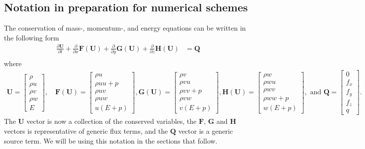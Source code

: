 \documentclass[10pt,letterpaper,notitlepage]{article}
\numberwithin{equation}{section}
\newcommand{\partialderiv}[2]{\frac{\partial #1}{\partial #2}}
\newcommand{\beqn}{\begin{equation}\begin{aligned}}
\newcommand{\eeqn}{\end{aligned}\end{equation}}
\begin{document}
\subsection{Notation in preparation for numerical schemes}
The conservation of mass-, momentum-, and energy equations can be written in the following form
\beqn \label{eq:euler_operator_form}
\partialderiv{\mathbf{U}}{t} + 
\partialderiv{}{x}\mathbf{F}(\mathbf{U}) +
\partialderiv{}{y}\mathbf{G}(\mathbf{U}) +
\partialderiv{}{z}\mathbf{H}(\mathbf{U}) 
&= 
 \mathbf{Q} \\
\eeqn 
where
\beqn 
\mathbf{U} = 
\begin{bmatrix}
\rho \\ 
\rho u \\
\rho v \\
\rho w \\ 
E
\end{bmatrix}
, \quad 
\mathbf{F}(\mathbf{U})=
\begin{bmatrix}
\rho u \\
\rho uu + p\\
\rho uv \\
\rho uw \\
u(E+p)
\end{bmatrix}
,
\mathbf{G}(\mathbf{U})=
\begin{bmatrix}
\rho v \\
\rho v u \\
\rho vv + p \\
\rho vw \\
v(E+p)
\end{bmatrix}
,
\mathbf{H}(\mathbf{U})=
\begin{bmatrix}
\rho w \\
\rho wu \\
\rho wv \\
\rho ww + p \\
w(E+p)
\end{bmatrix}
, \text{ and }
\mathbf{Q} = 
\begin{bmatrix}
0 \\
f_x \\
f_y \\
f_z \\
q
\end{bmatrix}.
\eeqn 
The $\mathbf{U}$ vector is now a collection of the conserved variables, 
the $\mathbf{F}$, $\mathbf{G}$ and $\mathbf{H}$ vectors is representative of generic flux terms, and the $\mathbf{Q}$ vector is a generic source term. We will be using this notation in the sections that follow.
\end{document}
